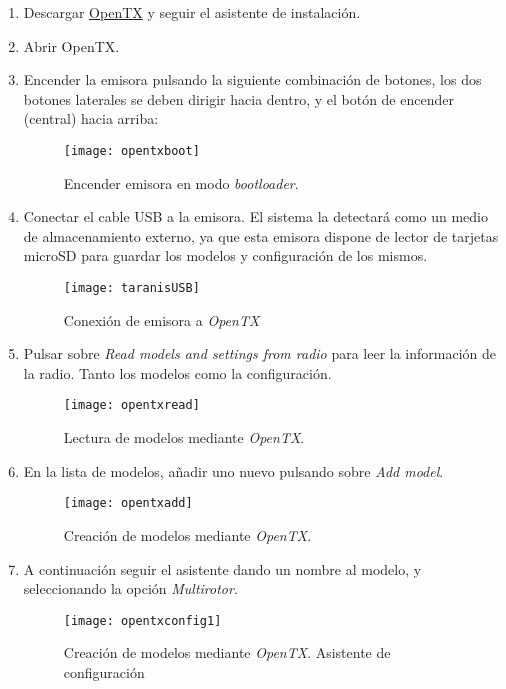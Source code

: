 \begin{enumerate}
\item Descargar \href{http://www.open-tx.org/downloads}{OpenTX} y seguir el asistente de instalación. 
\item Abrir OpenTX.
\item Encender la emisora pulsando la siguiente combinación de botones, los dos botones laterales se deben dirigir hacia dentro, y el botón de encender (central) hacia arriba: 
 \begin{figure}[H]
	\centering
	\texttt{[image: opentxboot]}
	\caption[Emisora en modo bootloader]{Encender emisora en modo \emph{bootloader}.}\label{fig:opentxboot}
\end{figure}
\item Conectar el cable USB a la emisora. El sistema la detectará como un medio de almacenamiento externo, ya que esta emisora dispone de lector de tarjetas microSD para guardar los modelos y configuración de los mismos.

\begin{figure}[H]
	\centering
	\texttt{[image: taranisUSB]}
	\caption[Emisora conectada]{Conexión de emisora a \emph{OpenTX}}\label{fig:taranisUSB}
\end{figure}

\item Pulsar sobre \emph{Read models and settings from radio} para leer la información de la radio. Tanto los modelos como la configuración.
\begin{figure}[H]
	\centering
	\texttt{[image: opentxread]}
	\caption[Lectura de modelos OpenTX]{Lectura de modelos mediante \emph{OpenTX}.}\label{fig:opentxread}
\end{figure}

\item En la lista de modelos, añadir uno nuevo pulsando sobre \emph{Add model}.
\begin{figure}[H]
	\centering
	\texttt{[image: opentxadd]}
	\caption[Creación de modelos OpenTX]{Creación de modelos mediante \emph{OpenTX}.}\label{fig:opentxadd}
\end{figure}

\item A continuación seguir el asistente dando un nombre al modelo, y seleccionando la opción \emph{Multirotor}.
\begin{figure}[H]
	\centering
	\texttt{[image: opentxconfig1]}
	\caption[Creación de modelos OpenTX. 1]{Creación de modelos mediante \emph{OpenTX}. Asistente de configuración}\label{fig:opentxconfig1}
\end{figure}


\end{enumerate}

